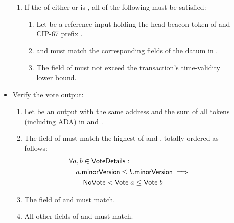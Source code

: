 \documentclass[../hydrozoa.tex]{subfiles}
\begin{document}
\begin{description}
\begin{itemize}
        \begin{enumerate}[resume]
          \item If the  of either  or  is , all of the following must be satisfied:
            \begin{enumerate}
              \item Let  be a reference input holding the head beacon token of  and CIP-67 prefix \headBeaconToken{}.
              \item {} and  must match the corresponding fields of the  datum in .
              \item The  field of  must not exceed the transaction's time-validity lower bound.
            \end{enumerate}
        \end{enumerate}
      \item Verify the vote output:
        \begin{enumerate}[resume]
          \item Let  be an output with the same address and the sum of all tokens (including ADA) in  and .
          \item The  field of  must match the highest  of  and , totally ordered as follows:
            \begin{equation*}
            \begin{split}
              &\forall a, b \in \mathsf{VoteDetails}:\\
              &\quad a \mathsf{.minorVersion} \leq b \mathsf{.minorVersion} \implies\\
              &\qquad \mathsf{NoVote} < \mathsf{Vote} \; a \leq \mathsf{Vote} \; b  
            \end{split}
            \end{equation*}
          \item The  field of  and  must match.
          \item All other fields of  and  must match.
        \end{enumerate}
    \end{itemize}
\end{description}
\end{document}
